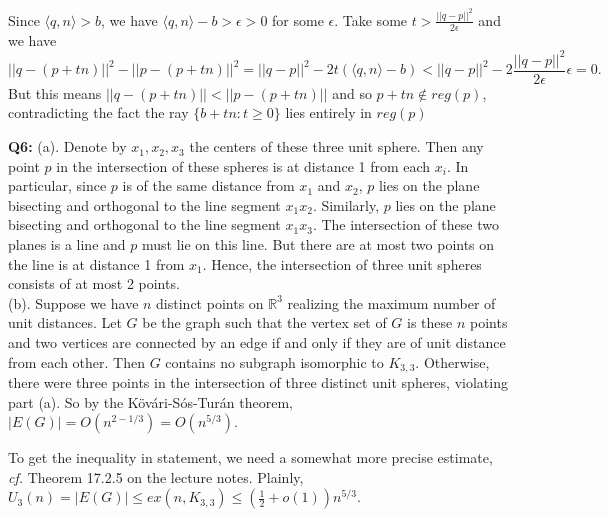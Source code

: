 \documentclass[12pt,reqno]{amsart}
\theoremstyle{definition}
\newcommand{\RR}{\mathbb{R}}
\newcommand{\dist}[2]{\mathrm{dist}(#1, #2)}
\newcommand{\inner}[1]{\langle #1 \rangle}
\begin{document}
Since $\inner{q,n}>b$, we have $\inner{q,n} -b >\epsilon >0$ for some $\epsilon$. Take some $t> \frac{||q-p||^2}{ 2\epsilon}$ and we have
$$ ||q-(p+tn)||^2  - ||p-(p+tn)||^2  = ||q-p||^2 - 2t( \inner{q,n} -b)  < ||q-p||^2 - 2 \frac{||q-p||^2}{ 2\epsilon}\epsilon=0.$$
But this means $||q-(p+tn)|| < ||p-(p+tn)||$ and so $p+tn\notin reg(p)$, contradicting the fact  the ray $\{b+tn: t\geq 0\}$ lies entirely in $reg(p)$





\newpage
\noindent \textbf{Q6:} (a). Denote by $x_1,x_2,x_3$ the centers of these three unit sphere. Then any point $p$ in the intersection of these spheres is at distance 1 from each $x_i$. In particular, since $p$ is of the same distance from $x_1$ and $x_2$, $p$ lies on the plane bisecting and orthogonal to the line segment $x_1x_2$. Similarly, $p$ lies on the plane bisecting and orthogonal to the line segment $x_1x_3$. The intersection of these two planes is a line and $p$ must lie on this line. But there are at most two points on the line is at distance 1 from $x_1$. Hence, the intersection of three unit spheres consists of at most 2 points.\\


(b). Suppose we have $n$ distinct points on $\RR^3$ realizing the maximum number of unit distances. Let $G$ be the graph such that the vertex set of $G$ is these $n$ points and two vertices are connected by an edge if and only if they are of unit distance from each other. Then $G$ contains no subgraph isomorphic to $K_{3,3}$. Otherwise, there were three points in the intersection of three distinct unit spheres, violating part (a). So by the K{\"o}v{\'a}ri-S{\'o}s-Tur{\'a}n theorem, $|E(G)| = O(n^{2-1/3}) = O(n^{5/3})$.

To get the inequality in statement, we need a somewhat more precise estimate, \emph{cf.} Theorem 17.2.5 on the lecture notes. Plainly, $U_3(n) = |E(G)|\leq ex(n,K_{3,3}) \leq (\frac{1}{2}+o(1)) n^{5/3}$.
\end{document}

